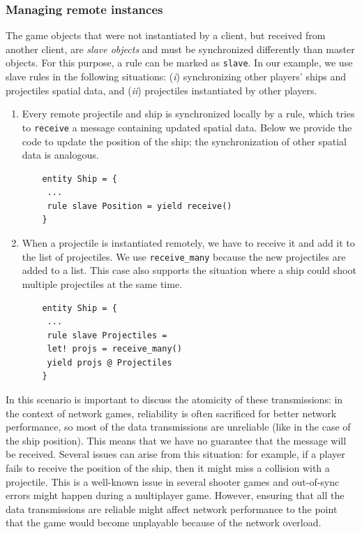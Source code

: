 \subsubsection{Managing remote instances}
The game objects that were not instantiated by a client, but received from another client, are \textit{slave objects} and must be synchronized differently than master objects. For this purpose, a rule can be marked as \texttt{slave}. In our example, we use slave rules in the following situations: (\textit{i}) synchronizing other players' ships and projectiles spatial data, and (\textit{ii}) projectiles instantiated by other players.

\begin{enumerate}
	\item Every remote projectile and ship is synchronized locally by a rule, which tries to \texttt{receive} a message containing updated spatial data. Below we provide the code to update the position of the ship; the synchronization of other spatial data is analogous.
	
	\begin{lstlisting}
	entity Ship = {
	 ...
	 rule slave Position = yield receive()
	}
	\end{lstlisting}
	
	\item When a projectile is instantiated remotely, we have to receive it and add it to the list of projectiles. We use \texttt{receive\_many} because the new projectiles are added to a list. This case also supports the situation where a ship could shoot multiple projectiles at the same time.
	
	\begin{lstlisting}
	entity Ship = {
	 ...
	 rule slave Projectiles =
	 let! projs = receive_many()
	 yield projs @ Projectiles
	}
	\end{lstlisting}
\end{enumerate}

In this scenario is important to discuss the atomicity of these transmissions: in the context of network games, reliability is often sacrificed for better network performance, so most of the data transmissions are unreliable (like in the case of the ship position). This means that we have no guarantee that the message will be received. Several issues can arise from this situation: for example, if a player fails to receive the position of the ship, then it might miss a collision with a projectile. This is a well-known issue in several shooter games and out-of-sync errors might happen during a multiplayer game. However, ensuring that all the data transmissions are reliable might affect network performance to the point that the game would become unplayable because of the network overload. 

